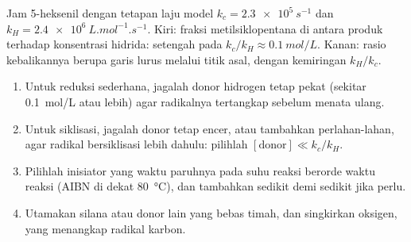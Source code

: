 \begin{omfigure}

{\small Jam 5-heksenil dengan tetapan laju model $k_c = \qty{2.3e5}{s^{-1}}$ dan
$k_H = \qty{2.4e6}{L.mol^{-1}.s^{-1}}$. Kiri: fraksi metilsiklopentana di antara produk terhadap
konsentrasi hidrida: setengah pada $k_c/k_H \approx \qty{0.1}{mol/L}$. Kanan: rasio kebalikannya berupa garis
lurus melalui titik asal, dengan kemiringan $k_H/k_c$.}
\end{omfigure}

\begin{method}\label{met:b3:radicals-carbenes:radical-chain}
\begin{enumerate}
  \item Untuk reduksi sederhana, jagalah donor hidrogen tetap pekat (sekitar
        \qty{0.1}{mol/L} atau lebih) agar radikalnya tertangkap sebelum menata ulang.
  \item Untuk siklisasi, jagalah donor tetap encer, atau tambahkan perlahan-lahan, agar
        radikal bersiklisasi lebih dahulu: pilihlah $[\text{donor}] \ll k_c/k_H$.
  \item Pilihlah inisiator yang waktu paruhnya pada suhu reaksi berorde
        waktu reaksi (AIBN di dekat \qty{80}{\celsius}), dan tambahkan sedikit demi sedikit jika
        perlu.
  \item Utamakan silana atau donor lain yang bebas timah, dan singkirkan oksigen, yang menangkap
        radikal karbon.
\end{enumerate}
\end{method}

